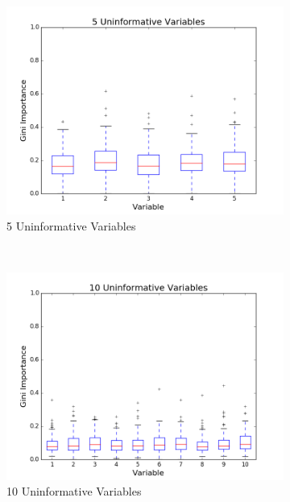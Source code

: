 \begin{figure}[h!]
  \centering
  \begin{subfigure}[b]{0.45\textwidth}
    \includegraphics[width=\textwidth]{figures/random_forests/rf_variable_count_bias_5.png}
    \caption{5 Uninformative Variables}
    \label{fig:var-count-5}
  \end{subfigure}
  ~
  \begin{subfigure}[b]{0.45\textwidth}
    \includegraphics[width=\textwidth]{figures/random_forests/rf_variable_count_bias_10.png}
    \caption{10 Uninformative Variables}
    \label{fig:var-count-10}
  \end{subfigure}
  ~
  \begin{subfigure}[b]{0.45\textwidth}

\end{subfigure}
\end{figure}
